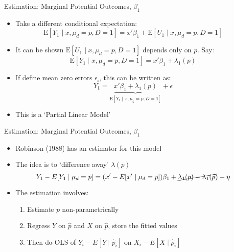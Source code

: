 \documentclass{beamer}
\begin{document}
\begin{frame}{Estimation:  Marginal Potential Outcomes, $\beta_1$}
  \begin{itemize}
\item Take a different conditional expectation:
\begin{equation*}
  \mathrm{E}[Y_1\mid x, \mu_d=p,D=1] = x'\beta_1 +  \mathrm{E}[U_1\mid x,\mu_d=p,
  D=1   ]
\end{equation*}
\item It can be shown $\mathrm{E}[U_1\mid x,\mu_d=p,
  D=1   ]$ depends only on $p$. Say:
  \begin{equation*}
    \mathrm{E}[Y_1\mid x, \mu_d=p,D=1] = x'\beta_1 +  \lambda_1(p)
  \end{equation*}
\item If define mean zero errors $\epsilon_i$, this can be written as:
 \begin{equation*}
    Y_1 = \underbrace{x'\beta_1 +  \lambda_1(p)}_{\mathrm{E}[Y_1\mid x, \mu_d=p,D=1]} + \epsilon
  \end{equation*}
\item This is a `Partial Linear Model'
\end{itemize}
\end{frame}

\begin{frame}{Estimation:  Marginal Potential Outcomes, $\beta_1$}
  \begin{itemize}
  \item Robinson (1988) has an estimator for this model
\item The idea is to
  `difference away' $\lambda(p)$
  \begin{equation*}
Y_1 - E[Y_1\mid \mu_d=p] = (x'-E[x'\mid \mu_d=p])\beta_1 +  \cancel{\lambda_1(p) - \lambda_1(p)} + \eta
\end{equation*}
\item The estimation involves:
\begin{enumerate}
\item Estimate ${p}$ non-parametrically
\item Regress $Y$ on $\hat{p}$ and $X$ on $\hat{p}$, store the fitted values
\item Then do OLS of $Y_i - E[Y\mid \hat{p}_i]$ on $X_i -
   E[X\mid \hat{p}_i]$
\end{enumerate}
  \end{itemize}

\end{frame}
\end{document}
